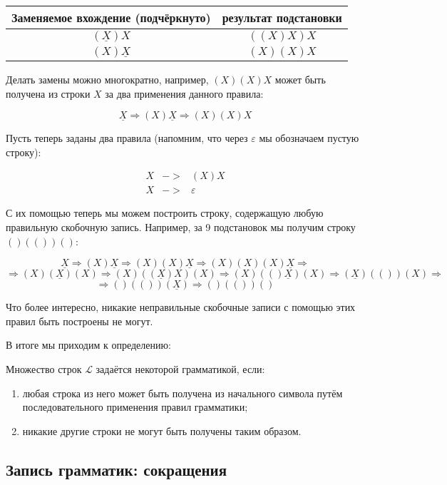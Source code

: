 \documentclass[12pt]{article}
\begin{document}
\vspace{0.2cm}\begin{tabular}{cc}
Заменяемое вхождение (подчёркнуто) & результат подстановки\\
\hline
$(\underline{X})X$ & $((X)X)X$ \\
$(X)\underline{X}$ & $(X)(X)X$
\end{tabular}\vspace{0.2cm}

Делать замены можно многократно, например, 
$(X)(X)X$ может быть получена из строки $X$ за два применения данного правила:

$$\underline{X} \Rightarrow (X)\underline{X} \Rightarrow (X)(X)X $$

Пусть теперь заданы два правила (напомним, что через $\varepsilon$ мы обозначаем пустую строку):
\begin{bnf}\begin{eqnarray*}
X &->& (X)X\\
X &->& \varepsilon
\end{eqnarray*}\end{bnf}%
С их помощью теперь мы можем построить строку, содержащую любую правильную скобочную
запись. Например, за 9 подстановок мы получим строку $()(())()$:

$$\underline{X} \Rightarrow (X)\underline{X} \Rightarrow (X)(X)\underline{X} 
\Rightarrow (X)(X)(X)\underline{X} \Rightarrow$$
$$\Rightarrow (X)(\underline{X})(X) \Rightarrow (X)((\underline{X})X)(X) 
\Rightarrow (X)(()\underline{X})(X) \Rightarrow (\underline{X})(())(X) \Rightarrow$$
$$\Rightarrow ()(())(\underline{X}) \Rightarrow ()(())()$$

Что более интересно, никакие неправильные скобочные записи с помощью этих
правил быть построены не могут.

В итоге мы приходим к определению:
\begin{definition} Множество строк $\mathcal{L}$ задаётся некоторой грамматикой, если:
\begin{enumerate}
\item любая строка из него может быть получена из начального символа путём 
последовательного применения правил грамматики;
\item никакие другие строки не могут быть получены таким образом.
\end{enumerate}
\end{definition}

\subsection{Запись грамматик: сокращения}
\end{document}
